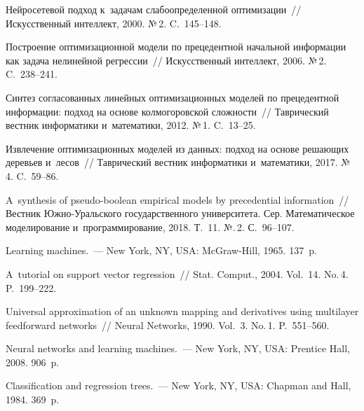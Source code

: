 \begin{multicols}{2}
{{\begin{thebibliography}{99}
 Нейросетевой подход к~задачам слабоопределенной оптимизации~// 
Искусственный интеллект, 2000. №\,2. C.~145--148.

 Построение оптимизационной модели по прецедентной 
начальной информации как задача нелинейной регрессии~// Искусственный 
интеллект, 2006. №\,2. C.~238--241.

 Синтез согласованных  линейных оптимизационных моделей  
по прецедентной информации: подход на основе колмогоровской сложности~// 
Таврический вестник информатики и~математики, 2012. №\,1. C.~13--25.

  Извлечение оптимизационных моделей из данных: 
подход на основе решающих деревьев и~лесов~// 
Таврический вестник информатики и~математики, 2017. №\,4. C.~59--86.

 A~synthesis of pseudo-boolean empirical models 
by precedential information~// 
Вестник Юж\-но-Ураль\-ско\-го государственного университета. Сер.
 Математическое моделирование и~программирование, 2018. Т.~11. №.\,2. С.~96--107.


 Learning machines.~--- New York, NY, USA: 
McGraw-Hill, 1965. 137~p.

A~tutorial on support vector regression~// Stat. Comput., 2004. Vol.~14. 
No.\,4. P.~199--222.

Universal approximation of an unknown mapping and derivatives using 
multilayer feedforward networks~// Neural Networks, 1990. Vol.~3. No.\,1. P.~551--560.

 Neural networks and learning machines.~--- 
New York, NY, USA: Prentice Hall,  2008. 906~p.

Classification and regression trees.~--- New York, NY, USA: 
Chapman and Hall, 1984. 369~p.

\end{thebibliography}

 }
 }

\end{multicols}


